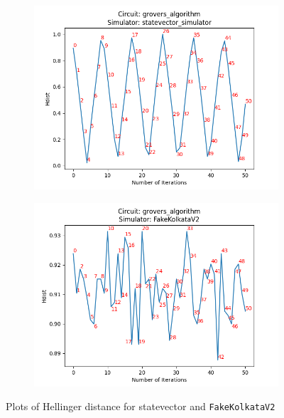 \documentclass[11pt]{article}
\begin{document}
\begin{figure}[hbtp]
    \begin{subfigure}{0.5\linewidth}
        \centering
        \includegraphics[width=\linewidth]{outputs/grovers_algorithm_statevector_simulator.png}
    \end{subfigure}
    \begin{subfigure}{0.5\linewidth}
        \centering
        \includegraphics[width=\linewidth]{outputs/grovers_algorithm_FakeKolkataV2.png}
    \end{subfigure}
    \caption{Plots of Hellinger distance for statevector and \texttt{FakeKolkataV2}}
    \label{fig:groverplots}
\end{figure}
\end{document}
